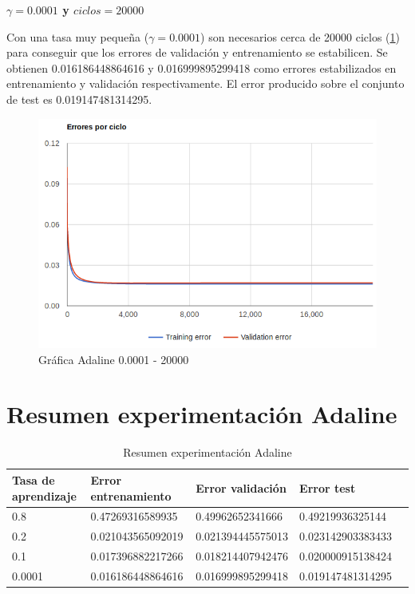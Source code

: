 \documentclass[11pt,spanish,listoffigures,listoftables]{workluis}
\begin{document}
\par \textbf{$\gamma = 0.0001$ y $ciclos = 20000$}

\par Con una tasa muy pequeña ($\gamma = 0.0001$) son necesarios cerca de 20000 ciclos (\ref{fig:000120000}) para conseguir que los errores de validación y entrenamiento se estabilicen. Se obtienen 0.016186448864616 y 0.016999895299418 como errores estabilizados en entrenamiento y validación respectivamente. El error producido sobre el conjunto de test es 0.019147481314295.

\begin{figure}[H]
\centering
\includegraphics[scale=0.5]{000120000}
\caption{Gráfica Adaline 0.0001 - 20000}\label{fig:000120000}
\end{figure}

\section{Resumen experimentación Adaline}

\begin{table}[H]
\centering
\caption{Resumen experimentación Adaline}
\label{tb:tb1}
\begin{tabular}{lllll}
\hline
\multicolumn{1}{|l|}{Tasa de aprendizaje} & Error entrenamiento & Error validación  & Error test        \\ \hline \hline
0.8                                       & 0.47269316589935    & 0.49962652341666  & 0.49219936325144  \\
0.2                                       & 0.021043565092019   & 0.021394445575013 & 0.023142903383433 \\
0.1                                       & 0.017396882217266   & 0.018214407942476 & 0.020000915138424 \\
0.0001                                    & 0.016186448864616   & 0.016999895299418 & 0.019147481314295 \\ \hline
\end{tabular}
\end{table}
\end{document}
